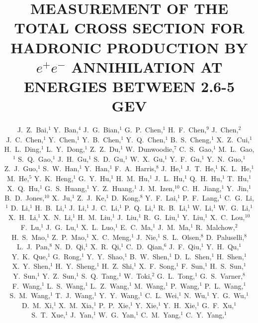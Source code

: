 


\title{\boldmath MEASUREMENT OF THE TOTAL CROSS SECTION FOR HADRONIC 
PRODUCTION BY $e^+e^-$ ANNIHILATION AT ENERGIES BETWEEN 2.6-5 GEV
\cite{support}}

\author{
J.~Z.~Bai,$^1$   Y.~Ban,$^4$      J.~G.~Bian,$^1$
G.~P.~Chen,$^1$  H.~F.~Chen,$^{9}$  
J.~Chen,$^2$ 
J.~C.~Chen,$^1$  Y.~Chen,$^1$ Y.~B.~Chen,$^1$  Y.~Q.~Chen,$^1$   
B.~S.~Cheng,$^1$  X.~Z.~Cui,$^1$
H.~L.~Ding,$^1$  L.~Y.~Dong,$^1$  Z.~Z.~Du,$^1$
W.~Dunwoodie,$^7$
C.~S.~Gao,$^1$   M.~L.~Gao,$^1$   S.~Q.~Gao,$^1$    
J.~H.~Gu,$^1$    S.~D.~Gu,$^1$    W.~X.~Gu,$^1$    Y.~F.~Gu,$^1$
Y.~N.~Guo,$^1$   Z.~J.~Guo,$^1$
S.~W.~Han,$^1$   Y.~Han,$^1$      
F.~A.~Harris,$^8$
J.~He,$^1$       J.~T.~He,$^1$
K.~L.~He,$^1$    M.~He,$^5$       Y.~K.~Heng,$^1$    
G.~Y.~Hu,$^1$    H.~M.~Hu,$^1$
J.~L.~Hu,$^1$    Q.~H.~Hu,$^1$    T.~Hu,$^1$        X.~Q.~Hu,$^1$
G.~S.~Huang,$^1$ Y.~Z.~Huang,$^1$
J.~M.~Izen,$^{10}$
C.~H.~Jiang,$^1$ Y.~Jin,$^1$
B.~D.~Jones,$^{10}$  
X.~Ju,$^{1}$    
Z.~J.~Ke,$^{1}$    
D.~Kong,$^8$
Y.~F.~Lai,$^1$    P.~F.~Lang,$^1$  
C.~G.~Li,$^1$     D.~Li,$^1$
H.~B.~Li,$^1$     J.~Li,$^1$       J.~C.~Li,$^1$
P.~Q.~Li,$^1$     R.~B.~Li,$^1$
W.~Li,$^1$        W.~G.~Li,$^1$    X.~H.~Li,$^1$     X.~N.~Li,$^1$
H.~M.~Liu,$^1$    J.~Liu,$^1$      R.~G.~Liu,$^1$    Y.~Liu,$^1$
X.~C.~Lou,$^{10}$ 
F.~Lu,$^1$        J.~G.~Lu,$^1$    X.~L.~Luo,$^1$
E.~C.~Ma,$^1$     J.~M.~Ma,$^1$    
R.~Malchow,$^2$   
H.~S.~Mao,$^1$    Z.~P.~Mao,$^1$   X.~C.~Meng,$^1$
J.~Nie,$^{1}$      
S.~L.~Olsen,$^8$   D.~Paluselli,$^8$ L.~J.~Pan,$^8$ 
N.~D.~Qi,$^1$    X.~R.~Qi,$^1$    C.~D.~Qian,$^6$   J.~F.~Qiu,$^1$
Y.~H.~Qu,$^1$    Y.~K.~Que,$^1$
G.~Rong,$^1$
Y.~Y.~Shao,$^1$  B.~W.~Shen,$^1$  D.~L.~Shen,$^1$   H.~Shen,$^1$
X.~Y.~Shen,$^1$  H.~Y.~Sheng,$^1$ H.~Z.~Shi,$^1$    X.~F.~Song,$^1$
F.~Sun,$^1$      H.~S.~Sun,$^1$   Y.~Sun,$^1$       Y.~Z.~Sun,$^1$
S.~Q.~Tang,$^1$  
W.~Toki,$^2$
G.~L.~Tong,$^1$
G.~S.~Varner,$^8$
F.~Wang,$^1$     L.~S.~Wang,$^1$  L.~Z.~Wang,$^1$   M.~Wang,$^1$
P.~Wang,$^1$     P.~L.~Wang,$^1$  S.~M.~Wang,$^1$   T.~J.~Wang,$^1$\cite{atNU0}
Y.~Y.~Wang,$^1$  
C.~L.~Wei,$^1$   N.~Wu,$^1$       Y.~G.~Wu,$^1$
D.~M.~Xi,$^1$    X.~M.~Xia,$^1$   P.~P.~Xie,$^1$    Y.~Xie,$^1$
Y.~H.~Xie,$^1$   G.~F.~Xu,$^1$    S.~T.~Xue,$^1$
J.~Yan,$^1$      W.~G.~Yan,$^1$   C.~M.~Yang,$^1$   C.~Y.~Yang,$^1$
}
